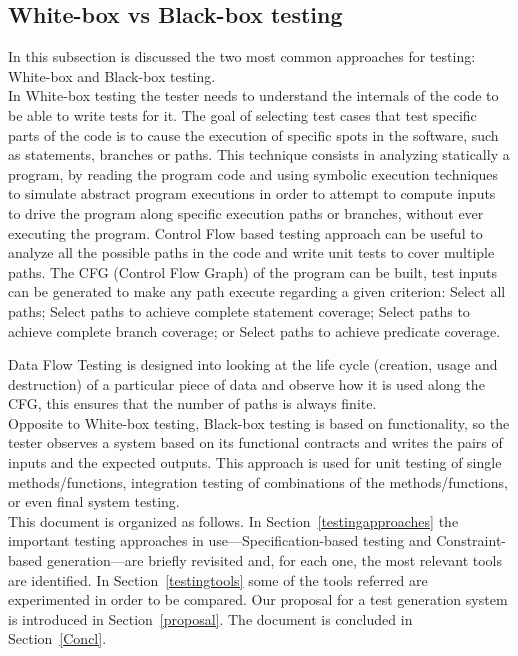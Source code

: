 \documentclass[a4paper,UKenglish]{oasics}
\begin{document}
\subsection{White-box vs Black-box testing}
In this subsection is discussed the two most common approaches for testing: White-box and Black-box testing.\\
In White-box testing the tester needs to understand the internals of
the code to be able to write tests for it.
The goal of selecting test cases that test specific parts of the code
is to cause the execution of specific spots in the software, such as
statements, branches or
paths.
This technique consists in analyzing statically a program, by reading
the program code and using symbolic execution techniques to simulate
abstract program
executions in order to attempt to compute inputs to drive the program
along specific execution paths or branches, without ever executing the
program. Control Flow based testing approach can be useful to analyze all the
possible paths in the code and write unit tests to cover multiple paths.
The CFG (Control Flow Graph) of the program can be built,
test inputs can be generated to make any path execute regarding a given criterion:
Select all paths;
Select paths to achieve complete statement
coverage\cite{stt,Ntafos:1988:CST:630792.631017};
Select paths to achieve complete branch coverage\cite{Roper1994,stt};
or Select paths to achieve predicate
coverage\cite{stt,Ntafos:1988:CST:630792.631017}.

Data Flow Testing is designed into looking at the life cycle
(creation, usage and destruction) of a particular
piece of data and observe how it is used along the CFG, this ensures
that the number of paths is always finite\cite{dataflow}.\\

Opposite to White-box testing, Black-box testing is based on
functionality, so the tester observes a system based
on its functional contracts and writes the pairs of inputs and the
expected outputs.
This approach is used for unit testing of single methods/functions,
integration testing
of combinations of the methods/functions, or even final system testing.\\

This document is organized as follows.
In Section~\ref{testingapproaches} the important testing approaches in
use---Specification-based testing and Constraint-based generation---are briefly
revisited and, for each one,  the most relevant tools are identified.
In Section~\ref{testingtools} some of the tools referred are
experimented in order to be compared.
Our proposal for a test generation system is introduced in
Section~\ref{proposal}.
The document is concluded in Section~\ref{Concl}.
\end{document}
